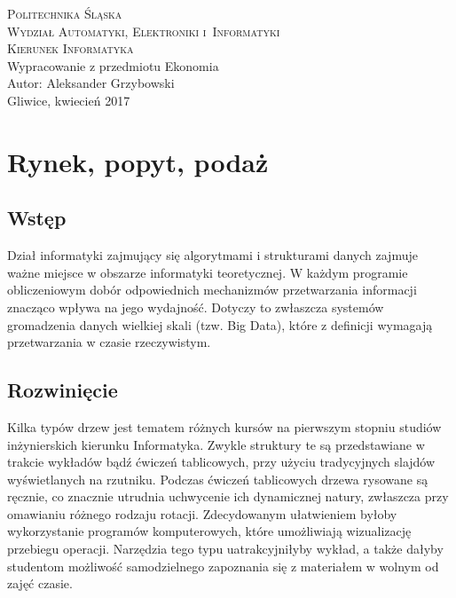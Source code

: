 \documentclass[12pt]{extarticle}
\begin{document}
\begin{titlepage}
    \begin{center}
        \textsc{\LARGE{Politechnika Śląska}}\\[0.5cm]
        \textsc{\LARGE{Wydział Automatyki, Elektroniki i~Informatyki}}\\[0.5cm]
        \textsc{\LARGE{Kierunek Informatyka}}\\[5.5cm]
        \LARGE{Wypracowanie z przedmiotu Ekonomia}\\[1cm]
        \LARGE{Autor: Aleksander Grzybowski}\\[1cm]
        \LARGE{Gliwice, kwiecień 2017}\\[1cm]
    \end{center}
\end{titlepage}



\section{Rynek, popyt, podaż}

\subsection{Wstęp}

	Dział informatyki zajmujący się algorytmami i strukturami danych zajmuje ważne miejsce w obszarze informatyki teoretycznej. W każdym programie obliczeniowym dobór odpowiednich mechanizmów przetwarzania informacji znacząco wpływa na jego wydajność. Dotyczy to zwłaszcza systemów gromadzenia danych wielkiej skali (tzw. Big Data), które z definicji wymagają przetwarzania w czasie rzeczywistym.

\subsection{Rozwinięcie}

	Kilka typów drzew jest tematem różnych kursów na pierwszym stopniu studiów inżynierskich kierunku Informatyka. Zwykle struktury te są przedstawiane w trakcie wykładów bądź ćwiczeń tablicowych, przy użyciu tradycyjnych slajdów wyświetlanych na rzutniku. Podczas ćwiczeń tablicowych drzewa rysowane są ręcznie, co znacznie utrudnia uchwycenie ich dynamicznej natury, zwłaszcza przy omawianiu różnego rodzaju rotacji. Zdecydowanym ułatwieniem byłoby wykorzystanie programów komputerowych, które umożliwiają wizualizację przebiegu operacji. Narzędzia tego typu uatrakcyjniłyby wykład, a także dałyby studentom możliwość samodzielnego zapoznania się z materiałem w wolnym od zajęć czasie.
\end{document}
